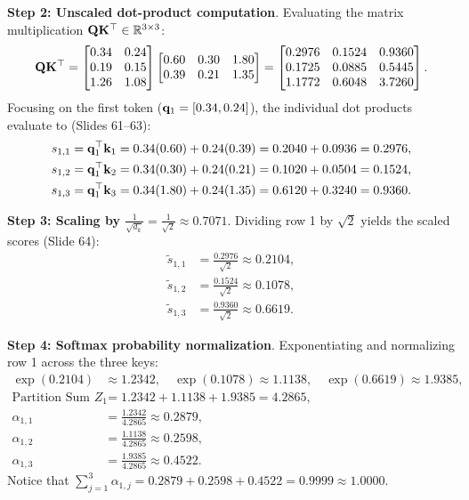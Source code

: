 \documentclass[../../main.tex]{subfiles}
\begin{document}
\noindent\textbf{Step 2: Unscaled dot-product computation}.\newline
Evaluating the matrix multiplication $\mathbf{Q} \mathbf{K}^\top \in \mathbb{R}^{3 \times 3}$:
\begin{equation}
\mathbf{Q} \mathbf{K}^\top = \begin{bmatrix}
0.34 & 0.24 \\
0.19 & 0.15 \\
1.26 & 1.08
\end{bmatrix}
\begin{bmatrix}
0.60 & 0.30 & 1.80 \\
0.39 & 0.21 & 1.35
\end{bmatrix}
= \begin{bmatrix}
0.2976 & 0.1524 & 0.9360 \\
0.1725 & 0.0885 & 0.5445 \\
1.1772 & 0.6048 & 3.7260
\end{bmatrix}.
\end{equation}
Focusing on the first token ($\mathbf{q}_1 = [0.34, 0.24]$), the individual dot products evaluate to (Slides 61--63):
\begin{align}
s_{1,1} &= \mathbf{q}_1^\top \mathbf{k}_1 = 0.34(0.60) + 0.24(0.39) = 0.2040 + 0.0936 = 0.2976, \\
s_{1,2} &= \mathbf{q}_1^\top \mathbf{k}_2 = 0.34(0.30) + 0.24(0.21) = 0.1020 + 0.0504 = 0.1524, \\
s_{1,3} &= \mathbf{q}_1^\top \mathbf{k}_3 = 0.34(1.80) + 0.24(1.35) = 0.6120 + 0.3240 = 0.9360.
\end{align}

\noindent\textbf{Step 3: Scaling by $\frac{1}{\sqrt{d_k}} = \frac{1}{\sqrt{2}} \approx 0.7071$}.\newline
Dividing row 1 by $\sqrt{2}$ yields the scaled scores (Slide 64):
\begin{align}
\tilde{s}_{1,1} &= \frac{0.2976}{\sqrt{2}} \approx 0.2104, \\
\tilde{s}_{1,2} &= \frac{0.1524}{\sqrt{2}} \approx 0.1078, \\
\tilde{s}_{1,3} &= \frac{0.9360}{\sqrt{2}} \approx 0.6619.
\end{align}

\noindent\textbf{Step 4: Softmax probability normalization}.\newline
Exponentiating and normalizing row 1 across the three keys:
\begin{align}
\exp(0.2104) &\approx 1.2342, \quad \exp(0.1078) \approx 1.1138, \quad \exp(0.6619) \approx 1.9385, \\
\text{Partition Sum } Z_1 &= 1.2342 + 1.1138 + 1.9385 = 4.2865, \\
\alpha_{1,1} &= \frac{1.2342}{4.2865} \approx 0.2879, \\
\alpha_{1,2} &= \frac{1.1138}{4.2865} \approx 0.2598, \\
\alpha_{1,3} &= \frac{1.9385}{4.2865} \approx 0.4522.
\end{align}
Notice that $\sum_{j=1}^3 \alpha_{1,j} = 0.2879 + 0.2598 + 0.4522 = 0.9999 \approx 1.0000$.
\end{document}
